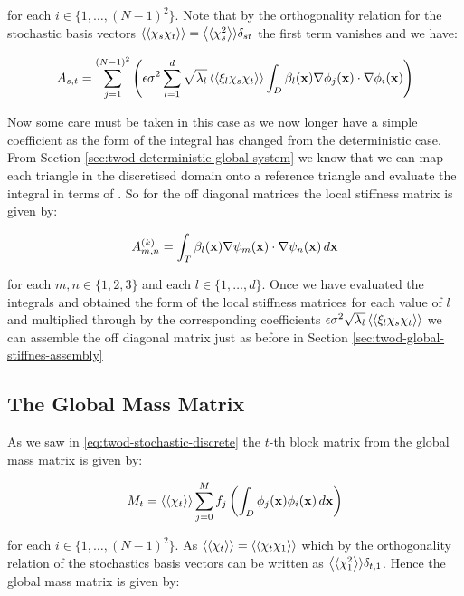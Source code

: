 for each $i \in \{1,\ldots,(N-1)^2\}$. Note that by the orthogonality
relation for the stochastic basis vectors $\left\langle\langle\chi_s\chi_t\right\rangle\rangle =
\left\langle\langle\chi_s^2\right\rangle\rangle\delta_{st}$ the first term vanishes and we have:

\begin{equation}
    A_{s,t} = \sum_{j=1}^{(N-1)^2}\left(\epsilon\sigma^2
    \sum_{l=1}^d\sqrt{\lambda_l}\left\langle\langle\xi_l\chi_s\chi_t\right\rangle\rangle
    \int_D\beta_l(\mathbf{x})\nabla\phi_j(\mathbf{x})\cdot\nabla\phi_i(\mathbf{x})\right)
\end{equation}

Now some care must be taken in this case as we now longer have a simple
coefficient as the form of the integral has changed from the deterministic
case. From Section \ref{sec:twod-deterministic-global-system} we know that we
can map each triangle in the discretised domain onto a reference triangle and
evaluate the integral in terms of . So for the off
diagonal matrices the local stiffness matrix is given by:

\begin{equation}
    A^{(k)}_{m,n} =
    \int_T\beta_l(\mathbf{x})\nabla\psi_m(\mathbf{x})\cdot\nabla\psi_n(\mathbf{x})\, d\mathbf{x}
\end{equation}

for each $m, n \in \{1, 2, 3\}$ and each $l \in \{1, \ldots, d\}$. Once we have
evaluated the integrals and obtained the form of the local stiffness matrices
for each value of $l$ and multiplied through by the corresponding coefficients
$\epsilon\sigma^2\sqrt{\lambda_l}\left\langle\langle\xi_l\chi_s\chi_t\right\rangle\rangle$ we can assemble
the off diagonal matrix just as before in Section
\ref{sec:twod-global-stiffnes-assembly}

\subsection{The Global Mass Matrix}

As we saw in \ref{eq:twod-stochastic-discrete} the $t$-th block matrix from the
global mass matrix is given by:

\begin{equation}
    M_t = \left\langle\langle\chi_t\right\rangle\rangle\sum_{j=0}^Mf_j
    \left(\int_D\phi_j(\mathbf{x})\phi_i(\mathbf{x})\, d\mathbf{x}\right)
\end{equation}

for each $i \in \{1, \ldots, (N-1)^2\}$. As $\left\langle\langle\chi_t\right\rangle\rangle =
\left\langle\langle\chi_t\chi_1\right\rangle\rangle$ which by the orthogonality relation of the stochastics basis
vectors can be written as $\left\langle\langle\chi_1^2\right\rangle\rangle\delta_{t,1}$. Hence the global
mass matrix is given by:

